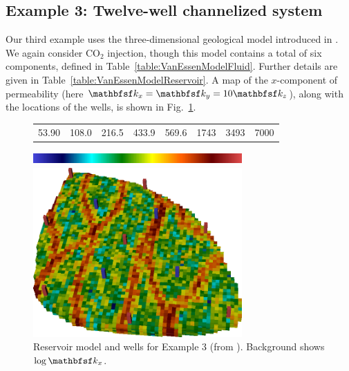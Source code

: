 \subsection{Example 3: Twelve-well channelized system}


Our third example uses the three-dimensional geological model introduced in
\cite{VanEssen}. We again consider CO$_2$ injection, though this model
contains a total of six components, defined in
Table~\ref{table:VanEssenModelFluid}. Further details are given in Table~\ref{table:VanEssenModelReservoir}.  A map of
the $x$-component of permeability (here $\tens{k}_x = \tens{k}_y = 10\tens{k}_z$), along with the
locations of the wells, is shown in Fig.~\ref{fig:VanEssenModelPermeabilityAndWells}.


\begin{figure}[ht]
     \begin{center}
      \begin{tabular}{cccccccc}
      53.90 & 108.0 & 216.5 & 433.9 & 569.6 & 1743 & 3493 & 7000 
      \end{tabular}
       \includegraphics[width=8cm,height=0.5cm]{figures/VanEssenModelPermeabilityMapColorBar.png}
                                                            
       \medskip
       
       \includegraphics[width=8cm]{figures/VanEssenModelPermeabilityMapConstant.png}%
     \end{center}
     \caption{Reservoir model and wells for Example 3 (from \cite{VanEssen}). Background shows $\log \tens{k}_x$.}
  \label{fig:VanEssenModelPermeabilityAndWells}
\end{figure}



